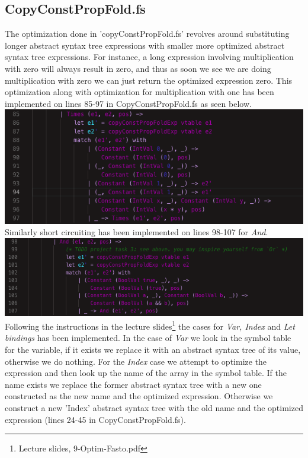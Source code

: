 \subsection{CopyConstPropFold.fs}
The optimization done in 'copyConstPropFold.fs' revolves around substituting longer abstract syntax tree expressions with smaller more optimized abstract syntax tree expressions. For instance, a long expression involving multiplication with zero will always result in zero, and thus as soon we see we are doing multiplication with zero we can just return the optimized expression zero. This optimization along with optimization for multiplication with one has been implemented on lines 85-97 in CopyConstPropFold.fs as seen below.\\
\includegraphics[width=\linewidth]{Materials/Optimization/Times}\\
Similarly short circuiting has been implemented on lines 98-107 for \textit{And}.\\
\includegraphics[width=\linewidth]{Materials/Optimization/And}\\
Following the instructions in the lecture slides\footnote{Lecture slides, 9-Optim-Fasto.pdf} the cases for \textit{Var, Index} and \textit{Let bindings} has been implemented. In the case of \textit{Var} we look in the symbol table for the variable, if it exists we replace it with an abstract syntax tree of its value, otherwise we do nothing. For the \textit{Index} case we attempt to optimize the expression and then look up the name of the array in the symbol table. If the name exists we replace the former abstract syntax tree with a new one constructed as the new name and the optimized expression. Otherwise we construct a new 'Index' abstract syntax tree with the old name and the optimized expression (lines 24-45 in CopyConstPropFold.fs).\\
